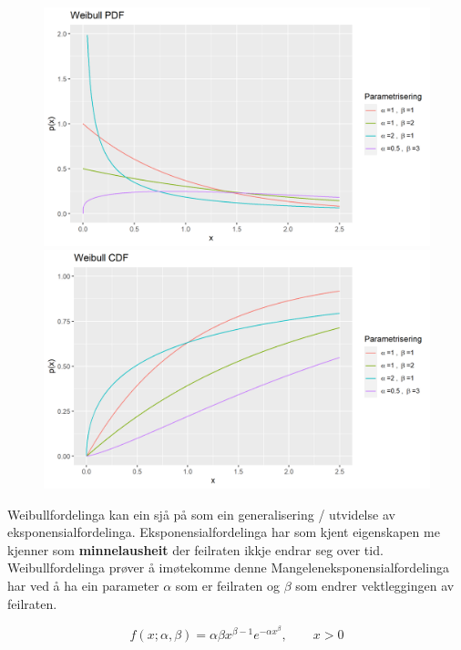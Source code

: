 \begin{figure}[H]
  \centering
  \begin{minipage}[b]{0.49\textwidth}
\includegraphics[width=\textwidth]{bilete/weibullpdf.png}
  \end{minipage}
  \hfill
  \begin{minipage}[b]{0.49\textwidth}
    \includegraphics[width=\textwidth]{bilete/weibullcdf.png}
  \end{minipage}
\end{figure}

Weibullfordelinga kan ein sjå på som ein generalisering / utvidelse av eksponensialfordelinga. Eksponensialfordelinga har som kjent eigenskapen me kjenner som \textbf{minnelausheit} der feilraten ikkje endrar seg over tid. Weibullfordelinga prøver å imøtekomme denne \startsitat Mangelen\sluttsitat eksponensialfordelinga har ved å ha ein parameter $\alpha$ som er feilraten og $\beta$ som endrer vektleggingen av feilraten.

\begin{equation}
    f(x; \alpha, \beta) = \alpha\beta x^{\beta - 1}e^{-\alpha x^\beta}, \qquad x > 0
\end{equation}

